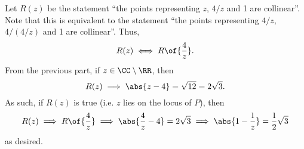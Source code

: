 \begin{solution}
\begin{ppart}
\begin{center}
        \end{center}
    \end{ppart}
    \begin{ppart}
        Let $R(z)$ be the statement ``the points representing $z$, $4/z$ and 1 are collinear''. Note that this is equivalent to the statement ``the points representing $4/z$, $4/(4/z)$ and 1 are collinear''. Thus, \[R(z) \iff R\of{\frac4z}.\] From the previous part, if $z \in \CC\setminus\RR$, then \[R(z) \implies \abs{z - 4} = \sqrt{12} = 2\sqrt{3}.\] As such, if $R(z)$ is true (i.e. $z$ lies on the locus of $P$), then \[R(z) \implies R\of{\frac4z} \implies \abs{\frac4z - 4} = 2\sqrt{3} \implies \abs{1 - \frac1z} = \frac12 \sqrt3\] as desired.
    \end{ppart}
\end{solution}

